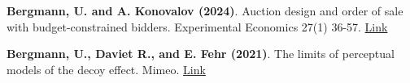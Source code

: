 \begin{section}

{\sffamily \textbf{Bergmann, U. and A. Konovalov (2024)}. Auction design and order of sale with budget-constrained bidders. Experimental Economics 27(1) 36-57. \href{https://doi.org/10.1007/s10683-023-09812-y}{ Link}

\sffamily \textbf{Bergmann, U., Daviet R., and E. Fehr (2021)}. The limits of perceptual models of the decoy effect. Mimeo. \href{https://drive.google.com/file/d/10n0DhVwwHHlVT4zgWzzDi1QxM7jso6Ua/view?usp=sharing}{ Link}}
\end{section}